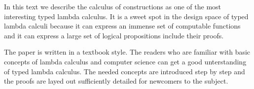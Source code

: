 In this text we describe the calculus of constructions as one of the most
interesting typed lambda calculus. It is a sweet spot in the design space of
typed lambda calculi because it can express an immense set of computable
functions and it can express a large set of logical propositions include their
proofs.

The paper is written in a textbook style. The readers who are familiar with
basic concepts of lambda calculus and computer science can get a good
unterstanding of typed lambda calculus. The needed concepts are introduced step
by step and the proofs are layed out sufficiently detailed for newcomers to the
subject.
